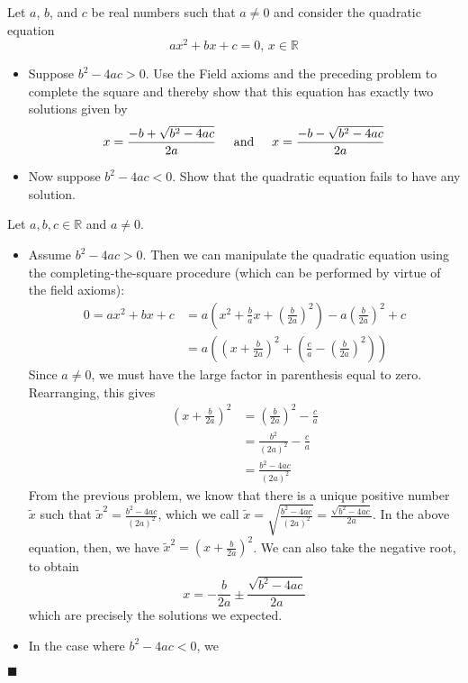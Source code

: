 \documentclass[12pt]{article}
\renewcommand{\qed}{\hfill$\blacksquare$}
\renewenvironment{proof}{\begin{addmargin}[1em]{0em}\begin{newproof}}{\end{newproof}\end{addmargin}\qed}
\newenvironment{problem}[2][Problem]{\begin{trivlist}
\item[\hskip \labelsep {\bfseries #1}\hskip \labelsep {\bfseries #2.}]}{\end{trivlist}}
\begin{document}
\begin{problem}{1.1.5}
Let $a$, $b$, and $c$ be real numbers such that $a\neq 0$ and consider the quadratic equation \[ ax^2 + bx + c = 0, \, x\in \mathbb{R} \]
\begin{itemize}
	\item Suppose $b^2-4ac >0$. Use the Field axioms and the preceding problem to complete the square and thereby show that this equation has exactly two solutions given by \[ x= \frac{-b+\sqrt{b^2-4ac}}{2a} \hspace{5mm} \text{and} \hspace{5mm} x=\frac{-b-\sqrt{b^2-4ac}}{2a} \]
	\item Now suppose $b^2-4ac <0$. Show that the quadratic equation fails to have any solution.
\end{itemize}
\end{problem}
\begin{proof}
Let $a,b,c \in \mathbb{R}$ and $a\neq 0$.
\begin{itemize}
	\item Assume $b^2-4ac>0$. Then we can manipulate the quadratic equation using the completing-the-square procedure (which can be performed by virtue of the field axioms):
	\begin{equation}
		\begin{split}
			0 = ax^2 + bx + c & = a\left(x^2 + \frac{b}{a}x + \left(\frac{b}{2a}\right)^2 \right) - a \left( \frac{b}{2a}\right)^2 + c \\
			& = a\left( \left(x + \frac{b}{2a}\right)^2 + \left(\frac{c}{a} - \left(\frac{b}{2a}\right)^2 \right)  \right)
		\end{split}
	\end{equation}
	Since $a\neq 0$, we must have the large factor in parenthesis equal to zero. Rearranging, this gives
	\[ \begin{split} \left(x+\frac{b}{2a}\right)^2 & = \left(\frac{b}{2a}\right)^2 - \frac{c}{a} \\ & = \frac{b^2}{\left(2a\right)^2} - \frac{c}{a} \\ & = \frac{b^2 - 4ac}{\left(2a\right)^2} \end{split} \] From the previous problem, we know that there is a unique positive number $\tilde{x}$ such that $\tilde{x}^2 = \frac{b^2-4ac}{\left(2a\right)^2}$, which we call $\tilde{x} = \sqrt{\frac{b^2-4ac}{\left(2a\right)^2}} = \frac{\sqrt{b^2 - 4ac}}{2a}$. In the above equation, then, we have $\tilde{x}^2 = \left(x+\frac{b}{2a}\right)^2$. We can also take the negative root, to obtain
	\[ x = -\frac{b}{2a} \pm \frac{\sqrt{b^2-4ac}}{2a} \] which are precisely the solutions we expected.
	
	\item In the case where $b^2-4ac <0$, we 
\end{itemize}
\end{proof}
\end{document}
